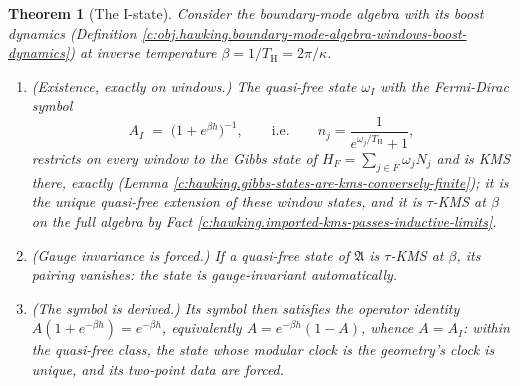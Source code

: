 \documentclass[11pt]{article}
\newtheorem{theorem}{Theorem}[section]
\theoremstyle{definition}
\theoremstyle{plain}
\providecommand{\TH}{}\renewcommand{\TH}{T_{\mathrm{H}}}
\begin{document}
\begin{theorem}[The I-state]\label{c:hawking.i-state}
Consider the boundary-mode algebra with its boost dynamics (Definition \ref{c:obj.hawking.boundary-mode-algebra-windows-boost-dynamics}) at inverse temperature $\beta = 1/\TH = 2\pi/\kappa$.
\begin{enumerate}
\item \emph{(Existence, exactly on windows.)} The quasi-free state $\omega_I$ with the Fermi-Dirac symbol
\[
A_I \;=\; \bigl(1 + e^{\beta h}\bigr)^{-1}, \qquad\text{i.e.}\qquad n_j = \frac{1}{e^{\omega_j/\TH} + 1},
\]
restricts on every window to the Gibbs state of $H_F = \sum_{j \in F}\omega_j N_j$ and is KMS there, exactly (Lemma \ref{c:hawking.gibbs-states-are-kms-conversely-finite}); it is the unique quasi-free extension of these window states, and it is $\tau$-KMS at $\beta$ on the full algebra by Fact \ref{c:hawking.imported-kms-passes-inductive-limits}.
\item \emph{(Gauge invariance is forced.)} If a quasi-free state of $\mathfrak{A}$ is $\tau$-KMS at $\beta$, its pairing vanishes: the state is gauge-invariant automatically.
\item \emph{(The symbol is derived.)} Its symbol then satisfies the operator identity $A(1 + e^{-\beta h}) = e^{-\beta h}$, equivalently $A = e^{-\beta h}(1 - A)$, whence $A = A_I$: within the quasi-free class, the state whose modular clock is the geometry's clock is unique, and its two-point data are forced.
\end{enumerate}
\end{theorem}
\end{document}
